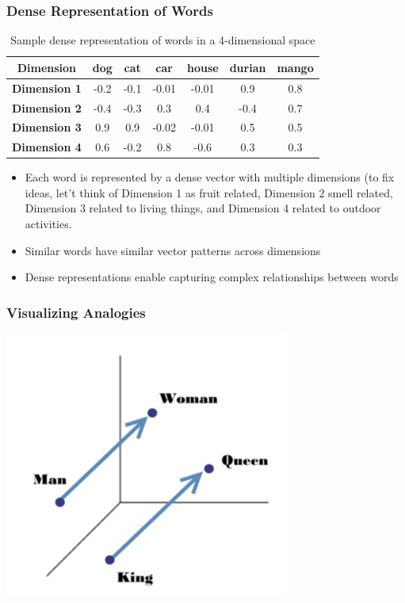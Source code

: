 \documentclass[compress, aspectratio=54]{beamer}
\begin{document}
\begin{frame}
\frametitle{Dense Representation of Words}

\begin{table}[ht]
\centering
\begin{tabular}{|c|c|c|c|c|c|c|}
\hline
\textbf{Dimension} & \textbf{dog} & \textbf{cat} & \textbf{car} & \textbf{house} & \textbf{durian} & \textbf{mango} \\
\hline
\textbf{Dimension 1} & -0.2 & -0.1 & -0.01 & -0.01 & 0.9 & 0.8 \\
\hline
\textbf{Dimension 2} & -0.4 & -0.3 & 0.3 & 0.4 & -0.4 & 0.7 \\
\hline
\textbf{Dimension 3} & 0.9 & 0.9 & -0.02 & -0.01 & 0.5 & 0.5 \\
\hline
\textbf{Dimension 4} &0.6 &  -0.2  & 0.8 & -0.6 & 0.3 & 0.3 \\
\hline
\end{tabular}
\caption{Sample dense representation of words in a 4-dimensional space}
\end{table}

\begin{itemize}
  \item Each word is represented by a dense vector with multiple dimensions (to fix ideas, let't think of Dimension 1 as fruit related, Dimension 2 smell related, Dimension 3 related to living things, and Dimension 4 related to outdoor activities.
  \item Similar words have similar vector patterns across dimensions
  \item Dense representations enable capturing complex relationships between words
\end{itemize}

\end{frame}
\begin{frame}
\frametitle{Visualizing Analogies}

\begin{center}
    \includegraphics[width=0.7\textwidth]{Figures/visualizing-analogies}
\end{center}
\end{frame}
\end{document}
